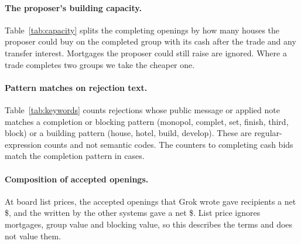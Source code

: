 \paragraph{The proposer's building capacity.}
Table~\ref{tab:capacity} splits the completing openings by how many houses the proposer could buy on the completed group with its cash after the trade and any transfer interest. Mortgages the proposer could still raise are ignored. Where a trade completes two groups we take the cheaper one.

\begin{table}[ht]\centering\small
\TableCapacity
\caption{Responses to opening offers that would complete only the proposer's group, by the proposer's house capacity after the trade.}
\label{tab:capacity}\end{table}

\paragraph{Pattern matches on rejection text.}
Table~\ref{tab:keywords} counts rejections whose public message or applied note matches a completion or blocking pattern (monopol, complet, set, finish, third, block) or a building pattern (house, hotel, build, develop). These are regular-expression counts and not semantic codes. The  counters to completing cash bids match the completion pattern in  cases.

\begin{table}[ht]\centering\small
\TableKeywords
\caption{Pattern matches in the text of rejected opening offers.}
\label{tab:keywords}\end{table}

\paragraph{Composition of accepted openings.}
At board list prices, the  accepted openings that Grok wrote gave recipients a net \$, and the  written by the other systems gave a net \$. List price ignores mortgages, group value and blocking value, so this describes the terms and does not value them.

